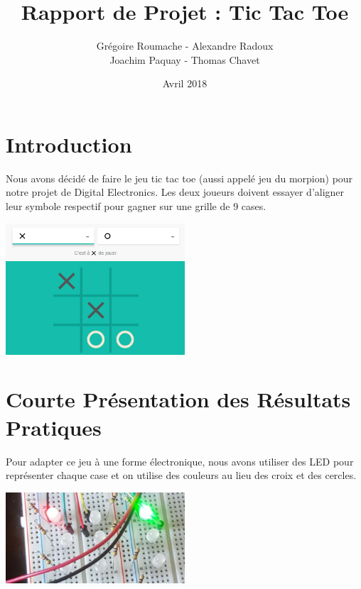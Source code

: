 \documentclass{article}
\title{Rapport de Projet : Tic Tac Toe}
\author{Grégoire Roumache - Alexandre Radoux \\ Joachim Paquay - Thomas Chavet}
\date{Avril 2018}
\begin{document}
\maketitle










\section{Introduction}





Nous avons décidé de faire le jeu tic tac toe (aussi appelé jeu du morpion) pour notre projet de Digital Electronics. Les deux joueurs doivent essayer d'aligner leur symbole respectif pour gagner sur une grille de 9 cases.

\begin{center} \includegraphics[width=0.5\textwidth]{images/TTT1.PNG} \end{center}










\section{Courte Présentation des Résultats Pratiques}





Pour adapter ce jeu à une forme électronique, nous avons utiliser des LED pour représenter chaque case et on utilise des couleurs au lieu des croix et des cercles.

\begin{center} \includegraphics[width=0.5\textwidth]{images/TTT2.PNG} \end{center}
\end{document}
